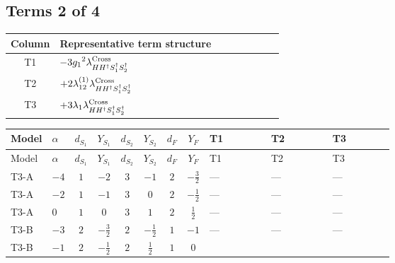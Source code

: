 \documentclass[8pt]{article}
\begin{document}
\begin{landscape}
\subsection*{Terms 2 of 4}
\begin{center}
\begin{tabular}{@{}c >{\raggedright\arraybackslash}p{0.82\linewidth}@{}}
\toprule
Column & Representative term structure \\
\midrule
T1 & \(\displaystyle -3 {g_1}^2 {\lambda_{H H^\dagger S_1^\dagger S_2^\dagger}^{\rm Cross}}\) \\
\midrule
T2 & \(\displaystyle +2 {\lambda_{12}^{(1)}} {\lambda_{H H^\dagger S_1^\dagger S_2^\dagger}^{\rm Cross}}\) \\
\midrule
T3 & \(\displaystyle +3 {\lambda_1} {\lambda_{H H^\dagger S_1^\dagger S_2^\dagger}^{\rm Cross}}\) \\
\midrule
\bottomrule
\end{tabular}
\end{center}
\smallskip
\tiny
\begin{longtable}{@{}llcccccc >{\raggedright\arraybackslash}p{0.21\linewidth} >{\raggedright\arraybackslash}p{0.21\linewidth} >{\raggedright\arraybackslash}p{0.21\linewidth}@{}}
\toprule
Model & $\alpha$ & $d_{S_1}$ & $Y_{S_1}$ & $d_{S_2}$ & $Y_{S_2}$ & $d_F$ & $Y_F$ & T1 & T2 & T3 \\
\midrule
\endfirsthead
\toprule
Model & $\alpha$ & $d_{S_1}$ & $Y_{S_1}$ & $d_{S_2}$ & $Y_{S_2}$ & $d_F$ & $Y_F$ & T1 & T2 & T3 \\
\midrule
\endhead
T3-A & $-4$ & $1$ & $-2$ & $3$ & $-1$ & $2$ & $-\frac{3}{2}$ & --- & --- & --- \\
\midrule
T3-A & $-2$ & $1$ & $-1$ & $3$ & $0$ & $2$ & $-\frac{1}{2}$ & --- & --- & --- \\
\midrule
T3-A & $0$ & $1$ & $0$ & $3$ & $1$ & $2$ & $\frac{1}{2}$ & --- & --- & --- \\
\midrule
T3-B & $-3$ & $2$ & $-\frac{3}{2}$ & $2$ & $-\frac{1}{2}$ & $1$ & $-1$ & --- & --- & --- \\
\midrule
T3-B & $-1$ & $2$ & $-\frac{1}{2}$ & $2$ & $\frac{1}{2}$ & $1$ & $0$ & \scriptsize\adjustbox{max width=\linewidth}{$\begin{gathered} -3 {g_1}^2 {\lambda_{H H^\dagger S_1^\dagger S_2^\dagger}^{\rm Cross}}\end{gathered}$} & \scriptsize\adjustbox{max width=\linewidth}{$\begin{gathered} +2 {\lambda_{12}^{(1)}} {\lambda_{H H^\dagger S_1^\dagger S_2^\dagger}^{\rm Cross}}\end{gathered}$} & \scriptsize\adjustbox{max width=\linewidth}{$\begin{gathered} +3 {\lambda_1} {\lambda_{H H^\dagger S_1^\dagger S_2^\dagger}^{\rm Cross}}\end{gathered}$} \\

\end{longtable}
\end{landscape}
\end{document}
